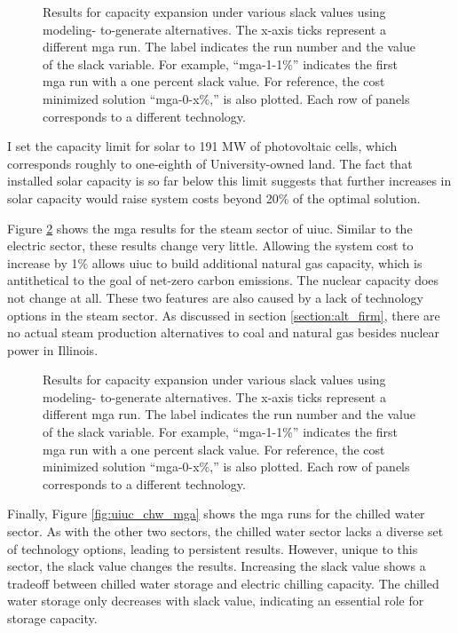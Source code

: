 \begin{figure}[H]
  \centering
  \resizebox{0.95\columnwidth}{!}{}
  \caption{Results for capacity expansion under various slack values using modeling-
  to-generate alternatives. The x-axis ticks represent a different \gls{mga} run.
  The label indicates the run number and the value of the slack variable. For example,
  ``mga-1-1\%'' indicates the first \gls{mga} run with a one percent
  slack value. For reference, the cost minimized solution ``mga-0-x\%,'' is also
  plotted. Each row of panels corresponds to a different technology.}
  \label{fig:uiuc_elc_mga}
\end{figure}

I set the capacity limit for solar to 191 MW of photovoltaic cells, which corresponds
roughly to one-eighth of University-owned land. The fact that installed solar capacity
is so far below this limit suggests that further increases in solar capacity would
raise system costs beyond 20\% of the optimal solution.

Figure \ref{fig:uiuc_thm_mga} shows the \gls{mga} results for the steam sector
of \gls{uiuc}. Similar to the electric sector, these results change very little.
Allowing the system cost to increase by 1\% allows \gls{uiuc} to build additional
natural gas capacity, which is antithetical to the goal of net-zero carbon emissions.
The nuclear capacity does not change at all. These two features are also caused
by a lack of technology options in the steam sector. As discussed in section \ref{section:alt_firm},
there are no actual steam production alternatives to coal and natural gas besides nuclear power
in Illinois.


\begin{figure}[H]
  \centering
  \resizebox{0.95\columnwidth}{!}{}
  \caption{Results for capacity expansion under various slack values using modeling-
  to-generate alternatives. The x-axis ticks represent a different \gls{mga} run.
  The label indicates the run number and the value of the slack variable. For example,
  ``mga-1-1\%'' indicates the first \gls{mga} run with a one percent
  slack value. For reference, the cost minimized solution ``mga-0-x\%,'' is also
  plotted. Each row of panels corresponds to a different technology.}
  \label{fig:uiuc_thm_mga}
\end{figure}

Finally, Figure \ref{fig:uiuc_chw_mga} shows the \gls{mga} runs for the chilled
water sector. As with the other two sectors, the chilled water sector lacks a
diverse set of technology options, leading to persistent results. However,
unique to this sector, the slack value changes the results. Increasing the slack
value shows a tradeoff between chilled water storage and electric chilling capacity.
The chilled water storage only decreases with slack value, indicating an
essential role for storage capacity.

